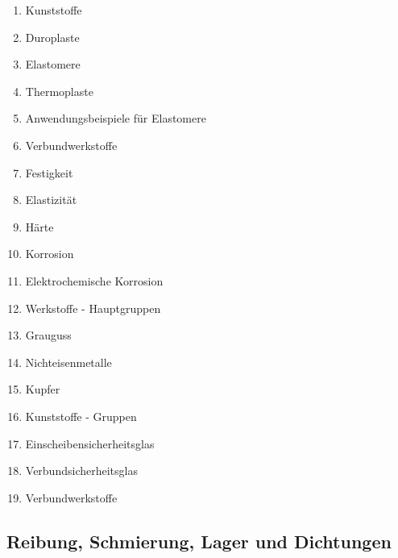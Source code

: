\begin{enumerate}
\item
  Kunststoffe\\
\item
  Duroplaste\\
\item
  Elastomere\\
\item
  Thermoplaste\\
\item
  Anwendungsbeispiele für Elastomere\\
\item
  Verbundwerkstoffe\\
\item
  Festigkeit\\
\item
  Elastizität\\
\item
  Härte\\
\item
  Korrosion\\
\item
  Elektrochemische Korrosion\\
\item
  Werkstoffe - Hauptgruppen\\
\item
  Grauguss\\
\item
  Nichteisenmetalle\\
\item
  Kupfer\\
\item
  Kunststoffe - Gruppen\\
\item
  Einscheibensicherheitsglas\\
\item
  Verbundsicherheitsglas\\
\item
  Verbundwerkstoffe
\end{enumerate}

\subsection{Reibung, Schmierung, Lager und
Dichtungen}\label{reibung-schmierung-lager-und-dichtungen}


